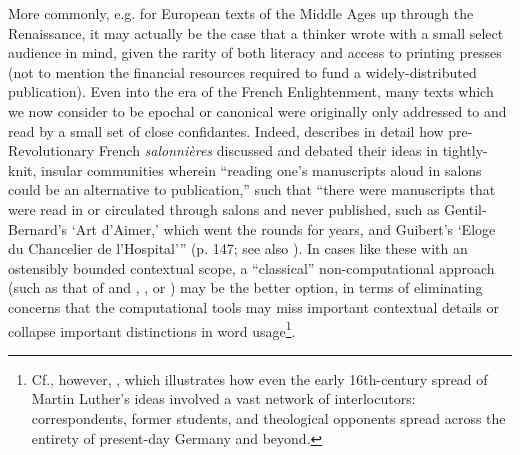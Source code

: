 More commonly, e.g. for European texts of the Middle Ages up through the Renaissance, it may actually be the case that a thinker wrote with a small select audience in mind, given the rarity of both literacy and access to printing presses (not to mention the financial resources required to fund a widely-distributed publication).
Even into the era of the French Enlightenment, many texts which we now consider to be epochal or canonical were originally only addressed to and read by a small set of close confidantes. Indeed, \cite{goodman_republic_1996} describes in detail how pre-Revolutionary French \textit{salonnières} discussed and debated their ideas in tightly-knit, insular communities wherein ``reading one's manuscripts aloud in salons could be an alternative to publication,'' such that ``there were manuscripts that were read in or circulated through salons and never published, such as Gentil-Bernard's `Art d'Aimer,' which went the rounds for years, and Guibert's `Eloge du Chancelier de l'Hospital'{''} (p. 147; see also \cite{chartier_cultural_1981}). In cases like these with an ostensibly bounded contextual scope, a ``classical'' non-computational approach (such as that of \cite{skinner_foundations_1978a} and \cite{skinner_foundations_1978b}, \cite{pocock_machiavellian_1975}, or \cite{baker_inventing_1990}) may be the better option, in terms of eliminating concerns that the computational tools may miss important contextual details or collapse important distinctions in word usage\footnote{Cf., however, \cite{becker_multiplex_2020}, which illustrates how even the early 16th-century spread of Martin Luther's ideas involved a vast network of interlocutors: correspondents, former students, and theological opponents spread across the entirety of present-day Germany and beyond.}.
